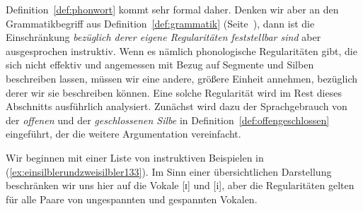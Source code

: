 
\Np

Definition~\ref{def:phonwort} kommt sehr formal daher.
Denken wir aber an den Grammatikbegriff aus Definition~\ref{def:grammatik} (Seite~\pageref{def:grammatik}), dann ist die Einschränkung \textit{bezüglich derer eigene Regularitäten feststellbar sind} aber ausgesprochen instruktiv.
Wenn es nämlich phonologische Regularitäten gibt, die sich nicht effektiv und angemessen mit Bezug auf Segmente und Silben beschreiben lassen, müssen wir eine andere, größere Einheit annehmen, bezüglich derer wir sie beschreiben können.
Eine solche Regularität wird im Rest dieses Abschnitts ausführlich analysiert.
Zunächst wird dazu der Sprachgebrauch von der \textit{offenen} und der \textit{geschlossenen Silbe} in Definition~\ref{def:offengeschlossen} eingeführt, der die weitere Argumentation vereinfacht.


Wir beginnen mit einer Liste von instruktiven Beispielen in (\ref{ex:einsilblerundzweisilbler133}). 
Im Sinn einer übersichtlichen Darstellung beschränken wir uns hier auf die Vokale [ɪ] und [i], aber die Regularitäten gelten für alle Paare von ungespannten und gespannten Vokalen.

\begin{exe}
  \ex\label{ex:einsilblerundzweisilbler133}
  \begin{xlist}
    \ex[*]{\label{ex:einsilblerundzweisilbler135} [knɪ]}
    \ex[*]{\label{ex:einsilblerundzweisilbler139} [viːŋk]}
    \ex[*]{\label{ex:einsilblerundzweisilbler140} [ʔaːlt]}
  \end{xlist}
\end{exe}

